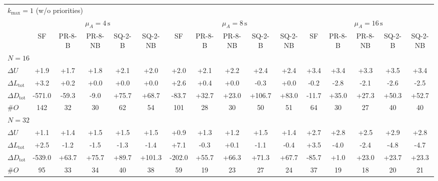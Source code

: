 \begin{tabular}{l c c c c c c c c c c c c c c c}
\toprule
\multicolumn{16}{l}{$k_{\max}=1$ (w/o priorities)} \\
\addlinespace[0.2em]
 & \multicolumn{5}{c}{$\mu_A=4\,\mathrm{s}$} & \multicolumn{5}{c}{$\mu_A=8\,\mathrm{s}$} & \multicolumn{5}{c}{$\mu_A=16\,\mathrm{s}$} \\
\cmidrule(lr){2-6}\cmidrule(lr){7-11}\cmidrule(lr){12-16}
 & SF & PR-8-B & PR-8-NB & SQ-2-B & SQ-2-NB & SF & PR-8-B & PR-8-NB & SQ-2-B & SQ-2-NB & SF & PR-8-B & PR-8-NB & SQ-2-B & SQ-2-NB \\
\midrule
\multicolumn{16}{l}{${N=16}$} \\
\midrule
$\Delta U$ & +1.9 & +1.7 & +1.8 & +2.1 & +2.0 & +2.0 & +2.1 & +2.2 & +2.4 & +2.4 & +3.4 & +3.4 & +3.3 & +3.5 & +3.4 \\
$\Delta L_{\mathrm{tot}}$ & +3.2 & +0.2 & +0.0 & +0.0 & +0.0 & +2.6 & +0.4 & +0.0 & -0.3 & +0.0 & -0.2 & -2.8 & -2.1 & -2.6 & -2.5 \\
$\Delta D_{\mathrm{tot}}$ & -571.0 & -59.3 & -9.0 & +75.7 & +68.7 & -83.7 & +32.7 & +23.0 & +106.7 & +83.0 & -11.7 & +35.0 & +27.3 & +50.3 & +52.7 \\
$\#O$ & 142 & 32 & 30 & 62 & 54 & 101 & 28 & 30 & 50 & 51 & 64 & 30 & 27 & 40 & 40 \\
\midrule
\multicolumn{16}{l}{${N=32}$} \\
\midrule
$\Delta U$ & +1.1 & +1.4 & +1.5 & +1.5 & +1.5 & +0.9 & +1.3 & +1.2 & +1.5 & +1.4 & +2.7 & +2.8 & +2.5 & +2.9 & +2.8 \\
$\Delta L_{\mathrm{tot}}$ & +2.5 & -1.2 & -1.5 & -1.3 & -1.4 & +7.1 & -0.3 & +0.1 & -1.1 & -0.4 & +3.5 & -4.0 & -2.4 & -4.8 & -4.7 \\
$\Delta D_{\mathrm{tot}}$ & -539.0 & +63.7 & +75.7 & +89.7 & +101.3 & -202.0 & +55.7 & +66.3 & +71.3 & +67.7 & -85.7 & +1.0 & +23.0 & +23.7 & +23.3 \\
$\#O$ & 95 & 33 & 34 & 40 & 38 & 59 & 19 & 23 & 27 & 24 & 37 & 19 & 18 & 20 & 21 \\
\bottomrule
\end{tabular}

